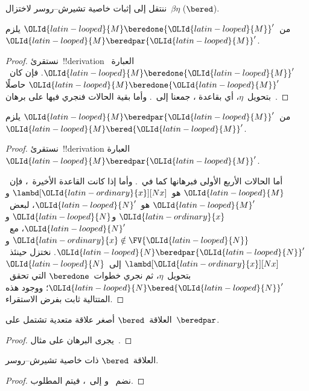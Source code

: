 \documentclass[../../../include/open-logic-section]{subfiles}
\begin{document}


ننتقل إلى إثبات خاصية تشيرش--روسر لاختزال~$\beta\eta$ ($\bered$).

\begin{lem}
  من~${\OLId{latin-looped}{M}} \beredone {\OLId{latin-looped}{M}}'$ يلزم~${\OLId{latin-looped}{M}} \beredpar {\OLId{latin-looped}{M}}'$.
\end{lem}

\begin{proof}
  نستقرئ~!!{derivation} العبارة~${\OLId{latin-looped}{M}} \beredone {\OLId{latin-looped}{M}}'$.
  فإن كان~${\OLId{latin-looped}{M}} \beredone {\OLId{latin-looped}{M}}'$ حاصلًا بتحويل~$\eta$، أي بقاعدة
  ، جمعنا
   إلى~.
  وأما بقية الحالات فنجري فيها على برهان~.
\end{proof}


\begin{lem}
  من~${\OLId{latin-looped}{M}} \beredpar {\OLId{latin-looped}{M}}'$ يلزم~${\OLId{latin-looped}{M}} \bered {\OLId{latin-looped}{M}}'$.
\end{lem}

\begin{proof}
  نستقرئ~!!{derivation} العبارة~${\OLId{latin-looped}{M}} \beredpar {\OLId{latin-looped}{M}}'$.

  أما الحالات الأربع الأولى فبرهانها كما في~.
  وأما إذا كانت القاعدة الأخيرة~، فإن~${\OLId{latin-looped}{M}}$
  هو~$\lambd[{\OLId{latin-ordinary}{x}}][Nx]$ و${\OLId{latin-looped}{M}}'$ هو~${\OLId{latin-looped}{N}}'$، لبعض~${\OLId{latin-ordinary}{x}}$ و${\OLId{latin-looped}{N}}$ و${\OLId{latin-looped}{N}}'$،
  مع~${\OLId{latin-ordinary}{x}} \notin \FV{{\OLId{latin-looped}{N}}}$ و${\OLId{latin-looped}{N}} \beredpar {\OLId{latin-looped}{N}}'$.
  نختزل حينئذ~$\lambd[{\OLId{latin-ordinary}{x}}][Nx]$ إلى~${\OLId{latin-looped}{N}}$ بتحويل~$\eta$،
  ثم نجري خطوات~$\beredone$ التي تحقق~${\OLId{latin-looped}{N}} \bered {\OLId{latin-looped}{N}}'$؛
  ووجود هذه المتتالية ثابت بفرض الاستقراء.
\end{proof}


\begin{lem}
  العلاقة~$\bered$ أصغر علاقة متعدية تشتمل على~$\beredpar$.
\end{lem}

\begin{proof}
  يجرى البرهان على مثال~.
\end{proof}

\begin{thm}
  العلاقة~$\bered$ ذات خاصية تشيرش--روسر.
\end{thm}

\begin{proof}
  نضم~ و إلى~، فيتم المطلوب.
\end{proof}
\end{document}
